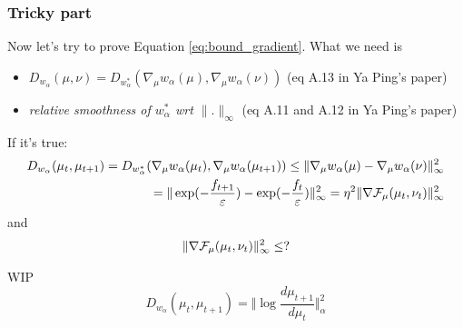 \documentclass[a4paper, 10pt]{article}
\begin{document}
\subsubsection{Tricky part}
Now let's try to prove Equation \ref{eq:bound_gradient}. 
What we need is 
\begin{itemize}
	\item $D_{w_{\alpha}}(\mu,\nu)=D_{w_{\alpha}^*}(\nabla_{\mu}w_{\alpha}(\mu), \nabla_{\mu}w_{\alpha}(\nu))$ (eq A.13 in Ya Ping's paper)
	\item  \textit{relative smoothness of $w_{\alpha}^*$ wrt $\|.\|_{\infty}$} (eq A.11 and A.12 in Ya Ping's paper)
\end{itemize}
 If it's true:
\begin{align*}
D_{w_{\alpha}}(\mu_t,\mu_{t+1}) = D_{w_{\alpha}^*}(\nabla_{\mu}w_{\alpha}(\mu_t), \nabla_{\mu}w_{\alpha}(\mu_{t+1}))\le \| \nabla_{\mu}w_{\alpha}(\mu)- \nabla_{\mu}w_{\alpha}(\nu)\|^2_{\infty}\\
=\| \exp(-\frac{f_{t+1}}{\varepsilon})- \exp(-\frac{f_t}{\varepsilon})\|^2_{\infty} = \eta^2 \| \nabla \mathcal{F}_{\mu}(\mu_t,\nu_t)\|^2_{\infty}
\end{align*}
and 
\begin{align*}
\|\nabla \mathcal{F}_{\mu}(\mu_t,\nu_t)\|^2_{\infty}\le ?
\end{align*}

WIP
\begin{equation}
    D_{w_{\alpha}}(\mu_t,\mu_{t+1}) =
    \Vert \log \frac{d \mu_{t+1}}{d \mu_{t}} \Vert_\alpha^2
\end{equation}



\printbibliography
\end{document}
